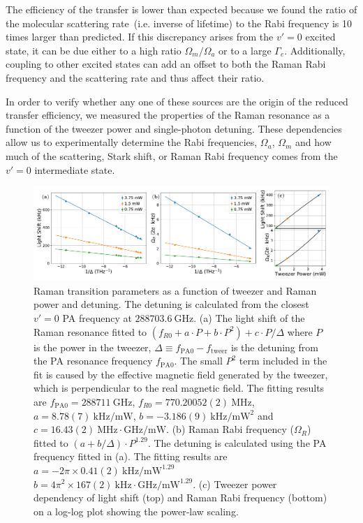\documentclass[aps,prl,twocolumn,10pt,superscriptaddress]{revtex4-1}
\begin{document}
The efficiency of the transfer is lower than expected
because we found the ratio of the molecular scattering rate~(i.e. inverse of lifetime)
to the Rabi frequency is 10 times larger than predicted.
If this discrepancy arises from the $v'=0$ excited state,
it can be due either to a high ratio $\Omega_m / \Omega_a$ or to a large $\Gamma_e$.
Additionally, coupling to other excited states can add an offset to
both the Raman Rabi frequency and the scattering rate and thus affect their ratio.

In order to verify whether any one of these sources are the origin of the reduced transfer efficiency,
we measured the properties of the Raman resonance as a function of the tweezer power and single-photon detuning.
These dependencies allow us to experimentally determine the Rabi frequencies,
$ \Omega_a $, $\Omega_m $ and how much of the scattering, Stark shift,
or Raman Rabi frequency comes from the $ v' = 0$ intermediate state.

\begin{figure}
  \includegraphics[width=\textwidth]{imgs/fig-det.pdf}
  \caption{Raman transition parameters as a function of tweezer and Raman power and detuning.
    The detuning is calculated from the closest $v'=0$ PA frequency at $288703.6~\mathrm{GHz}$.
    (a) The light shift of the Raman resonance fitted to
    $(f_{R0}+a\cdot P+b\cdot P^2)+c\cdot P/\Delta$
    where $P$ is the power in the tweezer,
    $\Delta\equiv f_{\mathrm{PA}0} - f_{\mathrm{tweer}}$ is the detuning from
    the PA resonance frequency $f_{\mathrm{PA}0}$.
    The small $P^2$ term included in the fit is caused by the effective magnetic field
    generated by the tweezer, which is perpendicular to the real magnetic field.
    The fitting results are $f_{\mathrm{PA}0}=288711~\mathrm{GHz}$,
    $f_{R0}=770.20052(2)~\mathrm{MHz}$, $a=8.78(7)~\mathrm{kHz/mW}$,
    $b=-3.186(9)~\mathrm{kHz/mW^2}$
    and $c=16.43(2)~\mathrm{MHz\cdot GHz/mW}$.
    (b) Raman Rabi frequency ($\Omega_R$) fitted to $(a + b/\Delta)\cdot P^{1.29}$.
    The detuning is calculated using the PA frequency fitted in (a).
    The fitting results are $a=-2\pi\times\!0.41(2)~\mathrm{kHz/mW^{1.29}}$
    $b=4\pi^2\times\!167(2)~\mathrm{kHz\cdot\!GHz/mW^{1.29}}$.
    (c) Tweezer power dependency of light shift (top) and Raman Rabi frequency (bottom)
    on a log-log plot showing the power-law scaling.
    \label{f-det}}
\end{figure}
\end{document}
